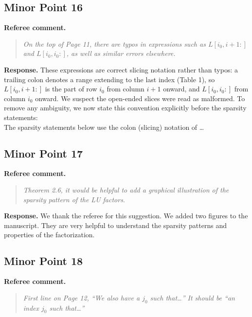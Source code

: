 \documentclass[11pt]{article}
\newenvironment{refereecomment}
{\par\smallskip\noindent\textbf{\color{commentblue}Referee comment.}
\begin{quote}\itshape}
  {
\end{quote}}
\newenvironment{authorresponse}
{\par\smallskip\noindent\textbf{\color{responsegreen}Response.}}
{\par\smallskip}
\begin{document}
\subsection*{Minor Point 16}

\begin{refereecomment}
  On the top of Page 11, there are typos in expressions such as $L[i_0, i+1 : ]$ and $L[i_0, i_0 : ]$, as well as similar errors elsewhere.
\end{refereecomment}

\begin{authorresponse}
  These expressions are correct slicing notation rather than typos: a trailing colon denotes a range extending to the last index (Table 1), so $L[i_0, i+1:]$ is the part of row $i_0$ from column $i+1$ onward, and $L[i_0, i_0:]$ from column $i_0$ onward. We suspect the open-ended slices were read as malformed. To remove any ambiguity, we now state this convention explicitly before the sparsity statements:\\
  \hspace*{2em}The sparsity statements below use the colon (slicing) notation of \dots
\end{authorresponse}

\subsection*{Minor Point 17}

\begin{refereecomment}
  Theorem 2.6, it would be helpful to add a graphical illustration of the sparsity pattern of the LU factors.
\end{refereecomment}

\begin{authorresponse}
  We thank the referee for this suggestion. We added two figures to the manuscript. They are very helpful to understand the sparsity patterns and properties of the factorization.
\end{authorresponse}

\subsection*{Minor Point 18}

\begin{refereecomment}
  First line on Page 12, “We also have a $j_0$ such that\dots” It should be “an index $j_0$ such that\dots”
\end{refereecomment}
\end{document}
